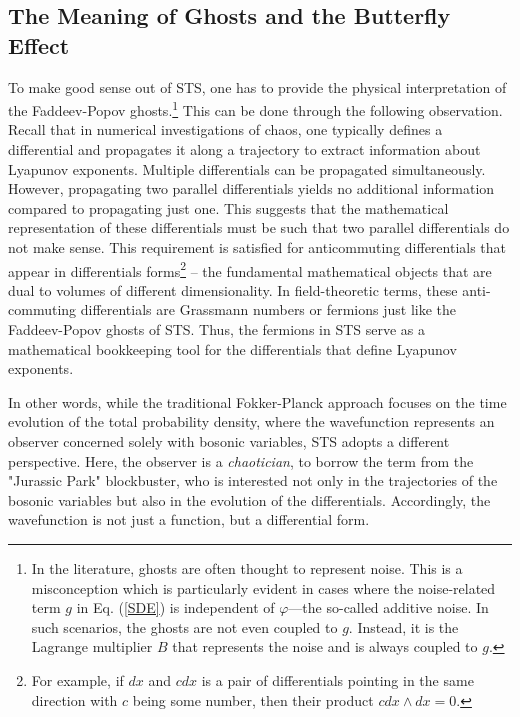 \documentclass[final,5p,10pt,times,twocolumn,year]{elsarticle}
\begin{document}
\subsection{The Meaning of Ghosts and the Butterfly Effect}
\label{Sec_Meaning_ofFermions}
To make good sense out of STS, one has to provide the physical interpretation of the Faddeev-Popov ghosts.\footnote{In the literature, ghosts are often thought to represent noise. This is a misconception which is particularly evident in cases where the noise-related term $g$ in Eq. (\ref{SDE}) is independent of $\varphi$—the so-called additive noise. In such scenarios, the ghosts are not even coupled to $g$. Instead, it is the Lagrange multiplier $B$ that represents the noise and is always coupled to $g$.} This can be done through the following observation. Recall that in numerical investigations of chaos, one typically defines a differential and propagates it along a trajectory to extract information about Lyapunov exponents. Multiple differentials can be propagated simultaneously. However, propagating two parallel differentials yields no additional information compared to propagating just one. This suggests that the mathematical representation of these differentials must be such that two parallel differentials do not make sense. This requirement is satisfied for anticommuting differentials that appear in differentials forms\footnote{For example, if $dx$ and $c dx$ is a pair of differentials pointing in the same direction with $c$ being some number, then their product $c dx\wedge dx = 0$.} -- the fundamental mathematical objects that are dual to volumes of different dimensionality. In field-theoretic terms, these anti-commuting differentials are Grassmann numbers or fermions just like the Faddeev-Popov ghosts of STS. Thus, the fermions in STS serve as a mathematical bookkeeping tool for the differentials that define Lyapunov exponents. 

In other words, while the traditional Fokker-Planck approach focuses on the time evolution of the total probability density, where the wavefunction represents an observer concerned solely with bosonic variables, STS adopts a different perspective. Here, the observer is a \emph{chaotician}, to borrow the term from the "Jurassic Park" blockbuster, who is interested not only in the trajectories of the bosonic variables but also in the evolution of the differentials. Accordingly, the wavefunction is not just a function, but a differential form.
\end{document}
